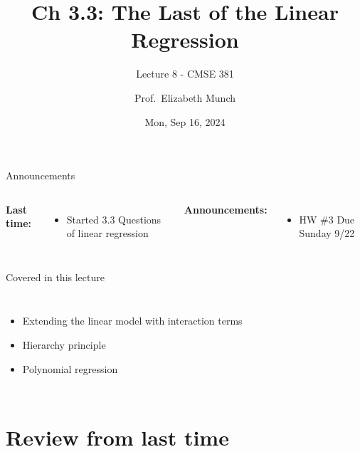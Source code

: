 \documentclass[aspectratio=169,usenames,dvipsnames]{beamer}
\begin{document}
\title[]{Ch 3.3: The Last of the Linear Regression}
\subtitle{Lecture 8 - CMSE 381}
\date{Mon, Sep 16, 2024}



\author[Dr.~Munch]{Prof.~Elizabeth Munch}

\begin{frame}
 \titlepage


\end{frame}
\begin{frame}[c]{Announcements}

\begin{columns}
\centering

	\textbf{Last time:}
	\begin{itemize}
		\item Started 3.3 Questions of linear regression
	\end{itemize}
\centering

\textbf{Announcements:}
	\begin{itemize}
		\item HW \#3 Due Sunday 9/22
	\end{itemize}
\end{columns}

\end{frame}
\begin{frame}[c]{Covered in this lecture }

\begin{columns}
\centering
\begin{itemize}
	\item Extending the linear model with interaction terms
	\item Hierarchy principle
	\item Polynomial regression
\end{itemize}
\centering

\end{columns}

\end{frame}
\section{Review from last time }
\end{document}
